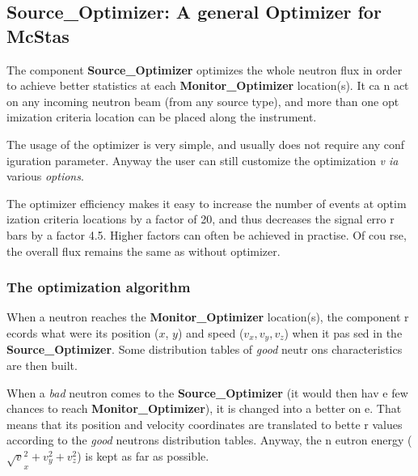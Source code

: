 \documentclass[12pt]{report}
\begin{document}
\subsection{Source\_Optimizer: A general Optimizer for McStas}
\label{s:sourceoptimizer}

The component {\bf Source\_Optimizer} optimizes the whole neutron flux in order 
to achieve better statistics at each {\bf Monitor\_Optimizer} location(s). It ca
n act on any incoming neutron beam (from any source type), and more than one opt
imization criteria location can be placed along the instrument. 

The usage of the optimizer is very simple, and usually does not require any conf
iguration parameter. Anyway the user can still customize the optimization {\it v
ia} various {\it options}.

The optimizer efficiency makes it easy to increase the number of events at optim
ization criteria locations by a factor of 20, and thus decreases the signal erro
r bars by a factor 4.5. Higher factors can often be achieved in practise. Of cou
rse, the overall flux remains the same as without optimizer.

\subsubsection{The optimization algorithm}

When a neutron reaches the {\bf Monitor\_Optimizer} location(s), the component r
ecords what were its position ($x$, $y$) and speed ($v_x, v_y, v_z$) when it pas
sed in the {\bf Source\_Optimizer}. Some distribution tables of {\it good} neutr
ons characteristics are then built. 

When a {\it bad} neutron comes to the {\bf Source\_Optimizer} (it would then hav
e few chances to reach {\bf Monitor\_Optimizer}), it is changed into a better on
e. That means that its position and velocity coordinates are translated to bette
r values according to the {\it good} neutrons distribution tables. Anyway, the n
eutron energy ($\surd v_x^2 + v_y^2 + v_z^2$) is kept as far as possible. 
\end{document}
